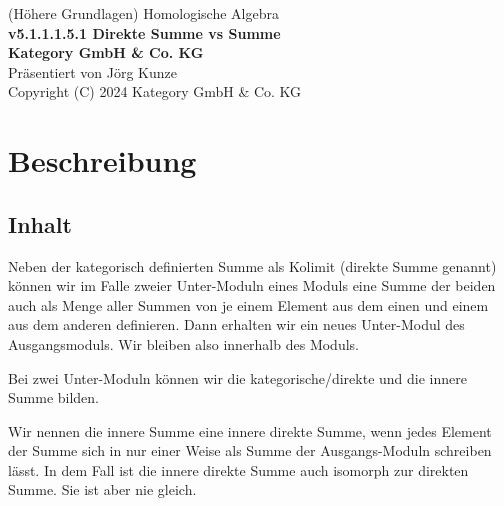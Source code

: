 \documentclass[a4paper]{amsart}
\theoremstyle{definition}
\begin{document}
\begin{titlepage}
\centering
{\huge
(Höhere Grundlagen) Homologische Algebra\\[1cm]
\textbf{v5.1.1.1.5.1 Direkte Summe vs Summe}
}\\[1cm]

\textbf{Kategory GmbH \& Co. KG}\\
Präsentiert von Jörg Kunze\\
Copyright (C) 2024 Kategory GmbH \& Co. KG

\end{titlepage}

%

\newpage

\section*{Beschreibung}

\subsection*{Inhalt}
Neben der kategorisch definierten Summe als Kolimit (direkte Summe genannt) können wir im Falle zweier Unter-Moduln eines Moduls eine Summe der beiden auch als Menge aller Summen von je einem Element aus dem einen und einem aus dem anderen definieren. Dann erhalten wir ein neues Unter-Modul des Ausgangsmoduls. Wir bleiben also innerhalb des Moduls.

Bei zwei Unter-Moduln können wir die kategorische/direkte und die innere Summe bilden.

Wir nennen die innere Summe eine innere direkte Summe, wenn jedes Element der Summe sich in nur einer Weise als Summe der Ausgangs-Moduln schreiben lässt. In dem Fall ist die innere direkte Summe auch isomorph zur direkten Summe. Sie ist aber nie gleich.
\end{document}
